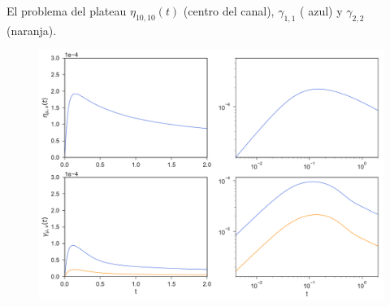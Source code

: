 \documentclass{beamer}
\begin{document}



\begin{frame}{El problema del plateau}
  $\eta_{10,10}(t)$ (centro del canal), $\gamma_{1,1}$ ({\color{blue} azul}) y $\gamma_{2,2}$ ({\color{orange}naranja}). 
\begin{figure}[]
  \includegraphics[scale=0.33]{NoPlateau-WALLS-17nodes}
\end{figure}
\end{frame}
\end{document}
